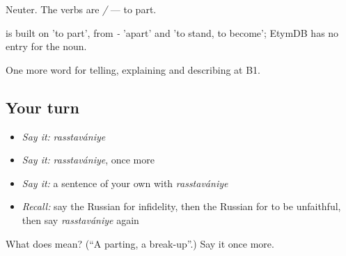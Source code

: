 Neuter. The verbs are \emph{ / } — to part.

\begin{cousinweb}
\emph{} is built on \emph{} 'to part', from \emph{-} 'apart' and \emph{} 'to stand, to become'; EtymDB has no entry for the noun.
\end{cousinweb}

\begin{grammarlens}[title={What you've built}]
One more word for telling, explaining and describing at B1.
\end{grammarlens}

\subsection*{Your turn}
\begin{itemize}
\raggedright
  \item \emph{Say it:} \emph{rasstavániye}
  \item \emph{Say it:} \emph{rasstavániye}, once more
  \item \emph{Say it:} a sentence of your own with \emph{rasstavániye}
  \item \emph{Recall:} say the Russian for infidelity, then the Russian for to be unfaithful, then say \emph{rasstavániye} again
\end{itemize}

\begin{tcolorbox}[breakable,colback=teal!4,colframe=teal!35!black,title={Before you move on}]
What does  mean? (\textquotedblleft{}A parting, a break-up\textquotedblright{}.) Say it once more.
\end{tcolorbox}
